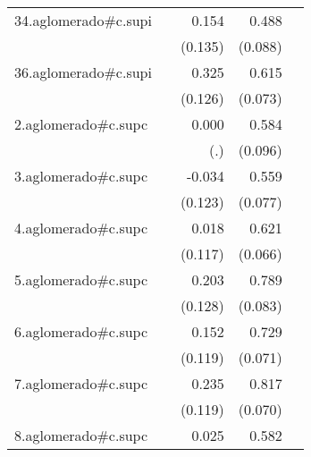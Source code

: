{\begin{longtable}{l*{4}{D{.}{.}{-1}}}
\addlinespace
34.aglomerado#c.supi&                     &       0.154         &       0.488\sym{***}&                     \\
            &                     &     (0.135)         &     (0.088)         &                     \\
\addlinespace
36.aglomerado#c.supi&                     &       0.325\sym{**} &       0.615\sym{***}&                     \\
            &                     &     (0.126)         &     (0.073)         &                     \\
\addlinespace
2.aglomerado#c.supc&                     &       0.000         &       0.584\sym{***}&                     \\
            &                     &         (.)         &     (0.096)         &                     \\
\addlinespace
3.aglomerado#c.supc&                     &      -0.034         &       0.559\sym{***}&                     \\
            &                     &     (0.123)         &     (0.077)         &                     \\
\addlinespace
4.aglomerado#c.supc&                     &       0.018         &       0.621\sym{***}&                     \\
            &                     &     (0.117)         &     (0.066)         &                     \\
\addlinespace
5.aglomerado#c.supc&                     &       0.203         &       0.789\sym{***}&                     \\
            &                     &     (0.128)         &     (0.083)         &                     \\
\addlinespace
6.aglomerado#c.supc&                     &       0.152         &       0.729\sym{***}&                     \\
            &                     &     (0.119)         &     (0.071)         &                     \\
\addlinespace
7.aglomerado#c.supc&                     &       0.235\sym{*}  &       0.817\sym{***}&                     \\
            &                     &     (0.119)         &     (0.070)         &                     \\
\addlinespace
8.aglomerado#c.supc&                     &       0.025         &       0.582\sym{***}&                     \\

\end{longtable}}
